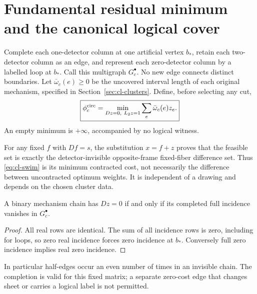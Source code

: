\section{Fundamental residual minimum and the canonical logical cover}
\label{sec:cl-cover}
\begin{definition}
\label{def:cl-swim}
Complete each one-detector column at one artificial vertex $b_*$, retain
each two-detector column as an edge, and represent each zero-detector
column by a labelled loop at $b_*$. Call this multigraph $G_c^\bullet$.
No new edge connects distinct boundaries. Let $\bar\omega_c(e)\ge0$ be
the uncovered interval length of each original mechanism, specified in
Section~\ref{sec:cl-clusters}. Define, before selecting any cut,
\begin{equation}
 \boxed{\displaystyle \phi_c^{\rm circ}
 =\min_{Dz=0,\ L_2z=1}\sum_e\bar\omega_c(e)z_e.}
 \label{eq:cl-swim}
\end{equation}
An empty minimum is $+\infty$, accompanied by no logical witness.
\end{definition}
For any fixed $f$ with $Df=s$, the substitution $x=f+z$ proves that the
feasible set is exactly the detector-invisible opposite-frame fixed-fiber
difference set. Thus \eqref{eq:cl-swim} is its minimum contracted cost,
not necessarily the difference between uncontracted optimum weights.
It is independent of a drawing and depends on the chosen cluster data.

\begin{lemma}
\label{lem:cl-boundary}
A binary mechanism chain has $Dz=0$ if and only if its completed full
incidence vanishes in $G_c^\bullet$.
\end{lemma}
\begin{proof}
All real rows are identical. The sum of all incidence rows is zero,
including for loops, so zero real incidence forces zero incidence at
$b_*$. Conversely full zero incidence implies real zero incidence.
\end{proof}
In particular half-edges occur an even number of times in an invisible
chain. The completion is valid for this fixed matrix; a separate zero-cost
edge that changes sheet or carries a logical label is not permitted.

